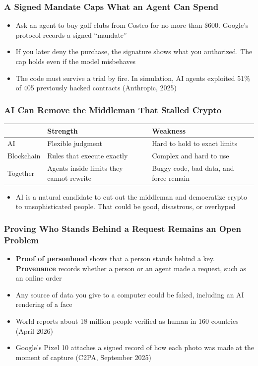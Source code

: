 \documentclass[aspectratio=169]{beamer}
\newcommand{\bi}{\begin{itemize}}
\newcommand{\ei}{\end{itemize}}
\newcommand{\m}{\item}
\begin{document}
\begin{frame}[label=appx-mandate]
\frametitle{A Signed Mandate Caps What an Agent Can Spend}

\bi
\m Ask an agent to buy golf clubs from Costco for no more than \$600. Google's protocol records a signed ``mandate''
\m If you later deny the purchase, the signature shows what you authorized. The cap holds even if the model misbehaves
\m The code must survive a trial by fire. In simulation, AI agents exploited 51\% of 405 previously hacked contracts (Anthropic, 2025)
\ei
\par\vspace{0pt plus 1fill}\hfill{\scriptsize \hyperlink{main-experiment}{}}
\end{frame}


\begin{frame}[label=appx-synthesis]
\frametitle{AI Can Remove the Middleman That Stalled Crypto}

\begin{center}
\small
\begin{tabular}{p{} p{} p{}}
\toprule
 & \textbf{Strength} & \textbf{Weakness} \\
\midrule
AI & Flexible judgment & Hard to hold to exact limits \\
Blockchain & Rules that execute exactly & Complex and hard to use \\
Together & Agents inside limits they cannot rewrite & Buggy code, bad data, and force remain \\
\bottomrule
\end{tabular}
\end{center}

\bi
\m AI is a natural candidate to cut out the middleman and democratize crypto to unsophisticated people. That could be good, disastrous, or overhyped
\ei
\par\vspace{0pt plus 1fill}\hfill{\scriptsize \hyperlink{main-northstar}{}}
\end{frame}


\begin{frame}[label=appx-personhood]
\frametitle{Proving Who Stands Behind a Request Remains an Open Problem}

\bi
\m \textbf{Proof of personhood} shows that a person stands behind a key. \textbf{Provenance} records whether a person or an agent made a request, such as an online order
\m Any source of data you give to a computer could be faked, including an AI rendering of a face
\m World reports about 18 million people verified as human in 160 countries (April 2026)
\m Google's Pixel 10 attaches a signed record of how each photo was made at the moment of capture (C2PA, September 2025)
\ei
\par\vspace{0pt plus 1fill}\hfill{\scriptsize \hyperlink{main-northstar}{}}
\end{frame}
\end{document}

